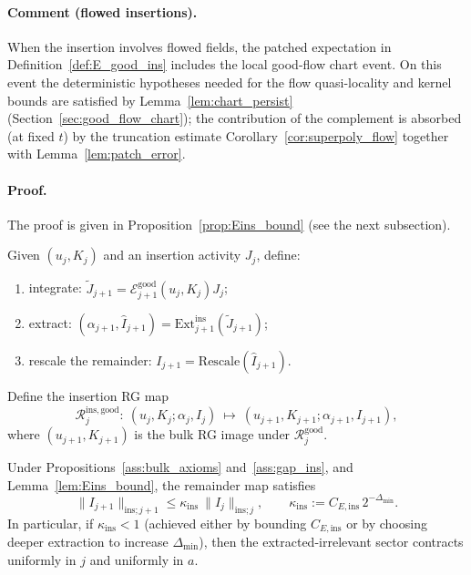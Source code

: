 \paragraph{Comment (flowed insertions).}
When the insertion involves flowed fields, the patched expectation in Definition~\ref{def:E_good_ins} includes the local good-flow chart event.
On this event the deterministic hypotheses needed for the flow quasi-locality and kernel bounds are satisfied by Lemma~\ref{lem:chart_persist}
(Section~\ref{sec:good_flow_chart}); the contribution of the complement is absorbed (at fixed $t$) by the truncation estimate
Corollary~\ref{cor:superpoly_flow} together with Lemma~\ref{lem:patch_error}.

\paragraph{Proof.}
The proof is given in Proposition~\ref{prop:Eins_bound} (see the next subsection).

\begin{definition}\label{def:RG_ins}
Given $(u_j,K_j)$ and an insertion activity $J_j$, define:
\begin{enumerate}[label=(\arabic*)]
\item integrate: $\widetilde J_{j+1}=\mathcal E^{\mathrm{good}}_{j+1}(u_j,K_j)J_j$;
\item extract: $(\alpha_{j+1},\widehat I_{j+1})=\mathrm{Ext}^{\mathrm{ins}}_{j+1}(\widetilde J_{j+1})$;
\item rescale the remainder: $I_{j+1}=\mathrm{Rescale}(\widehat I_{j+1})$.
\end{enumerate}
Define the insertion RG map
\[
\mathcal R^{\mathrm{ins,good}}_j:\ (u_j,K_j;\alpha_j,I_j)\ \longmapsto\ (u_{j+1},K_{j+1};\alpha_{j+1},I_{j+1}),
\]
where $(u_{j+1},K_{j+1})$ is the bulk RG image under $\mathcal R^{\mathrm{good}}_j$.
\end{definition}

\begin{proposition}\label{prop:ins_contract}
Under Propositions~\ref{ass:bulk_axioms} and~\ref{ass:gap_ins}, and Lemma~\ref{lem:Eins_bound},
the remainder map satisfies
\[
\|I_{j+1}\|_{\mathrm{ins};j+1}
\le \kappa_{\mathrm{ins}}\ \|I_j\|_{\mathrm{ins};j},
\qquad
\kappa_{\mathrm{ins}}:=C_{E,\mathrm{ins}}\,2^{-\Delta_{\min}}.
\]
In particular, if $\kappa_{\mathrm{ins}}<1$ (achieved either by bounding $C_{E,\mathrm{ins}}$ or by choosing deeper extraction to increase $\Delta_{\min}$),
then the extracted-irrelevant sector contracts uniformly in $j$ and uniformly in $a$.
\end{proposition}


